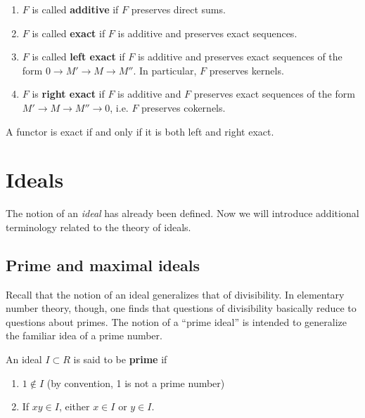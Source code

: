 \begin{definition} 
\begin{enumerate}
\item  $F$ is called \textbf{additive} if $F$ preserves direct sums.  
\item  $F$ is called \textbf{exact} if $F$ is additive and preserves exact sequences.  
\item  $F$ is called \textbf{left exact} if $F$ is additive and preserves exact sequences of the form
$0 \to M' \to M \to M''$.  In particular, $F$ preserves kernels.  
\item  $F$ is \textbf{right exact} if $F$ is additive and $F$ preserves exact
sequences of the form $M' \to M \to M'' \to 0$, i.e. $F$ preserves cokernels.  
\end{enumerate}
\end{definition} 

A functor is exact if and only if it is both left and right exact.  



\section{Ideals}

The notion of an \emph{ideal} has already been defined. Now we will introduce additional terminology related to the theory of ideals.

\subsection{Prime and maximal ideals}

Recall that the notion of an ideal generalizes that of divisibility. In
elementary number theory, though, one finds that questions of divisibility
basically reduce to questions about primes. 
The notion of a ``prime ideal'' is intended to generalize the familiar idea of a prime
number.

\begin{definition} 
An ideal $I \subset R$ is said to be \textbf{prime} if
\begin{enumerate}[\textbf{P} 1]
\item  $1 \notin I$ (by convention, 1 is not a prime number)
\item If $xy \in I$, either $x \in I$ or $y \in I$.
\end{enumerate}
\end{definition} 

